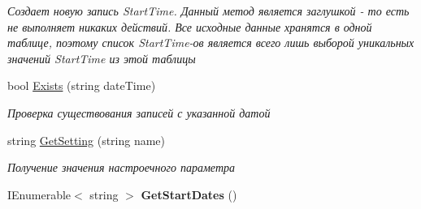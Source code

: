 \begin{DoxyCompactItemize}
\begin{DoxyCompactList}\small\item\em Создает новую запись Start\+Time. Данный метод является заглушкой -\/ то есть не выполняет никаких действий. Все исходные данные хранятся в одной таблице, поэтому список Start\+Time-\/ов является всего лишь выборой уникальных значений Start\+Time из этой таблицы \end{DoxyCompactList}\item 
bool \hyperlink{class_advert_data_1_1_database_a6d68c71acccd791dbabc11b69af15656}{Exists} (string date\+Time)
\begin{DoxyCompactList}\small\item\em Проверка существования записей с указанной датой \end{DoxyCompactList}\item 
string \hyperlink{class_advert_data_1_1_database_acd02f2b52c12782c264db0041e9f6ffb}{Get\+Setting} (string name)
\begin{DoxyCompactList}\small\item\em Получение значения настроечного параметра \end{DoxyCompactList}\item 
\hypertarget{class_advert_data_1_1_database_a7fd09fc8bf0c77fb716156ce482942cd}{I\+Enumerable$<$ string $>$ {\bfseries Get\+Start\+Dates} ()}\label{class_advert_data_1_1_database_a7fd09fc8bf0c77fb716156ce482942cd}


\end{DoxyCompactItemize}
